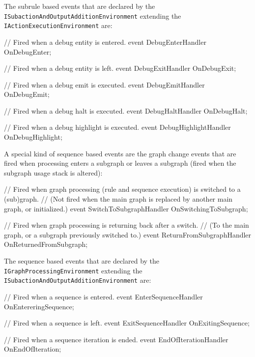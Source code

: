 The subrule based events that are declared by the \texttt{ISubaction\-And\-Output\-Addition\-Environment} extending the \texttt{IActionExecutionEnvironment} are:

\begin{csharplet}
// Fired when a debug entity is entered.
event DebugEnterHandler OnDebugEnter;

// Fired when a debug entity is left.
event DebugExitHandler OnDebugExit;

// Fired when a debug emit is executed.
event DebugEmitHandler OnDebugEmit;

// Fired when a debug halt is executed.
event DebugHaltHandler OnDebugHalt;

// Fired when a debug highlight is executed.
event DebugHighlightHandler OnDebugHighlight;
\end{csharplet}

A special kind of sequence based events are the graph change events that are fired when processing enters a subgraph or leaves a subgraph (fired when the subgraph usage stack is altered):

\begin{csharplet}
// Fired when graph processing (rule and sequence execution) is switched to a (sub)graph.
// (Not fired when the main graph is replaced by another main graph, or initialized.)
event SwitchToSubgraphHandler OnSwitchingToSubgraph;

// Fired when graph processing is returning back after a switch.
// (To the main graph, or a subgraph previously switched to.)
event ReturnFromSubgraphHandler OnReturnedFromSubgraph;
\end{csharplet}

The sequence based events that are declared by the \texttt{IGraph\-Processing\-Environment} extending the \texttt{ISubaction\-And\-Output\-Addition\-Environment} are:

\begin{csharplet}
// Fired when a sequence is entered.
event EnterSequenceHandler OnEntereringSequence;

// Fired when a sequence is left.
event ExitSequenceHandler OnExitingSequence;

// Fired when a sequence iteration is ended.
event EndOfIterationHandler OnEndOfIteration;
\end{csharplet}
